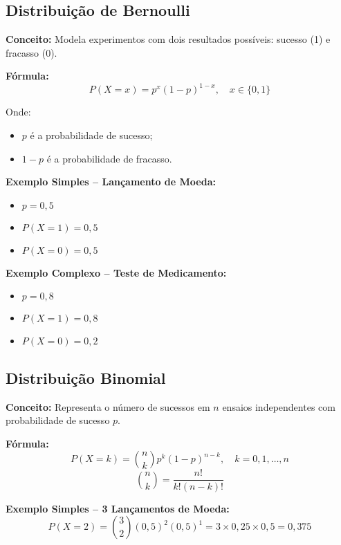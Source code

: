 \documentclass[a4paper,12pt]{article}
\begin{document}
\subsection{Distribuição de Bernoulli}

\textbf{Conceito:} Modela experimentos com dois resultados possíveis: sucesso (1) e fracasso (0).

\textbf{Fórmula:}
\begin{equation}
P(X = x) = p^x (1 - p)^{1 - x}, \quad x \in \{0, 1\}
\end{equation}

Onde:
\begin{itemize}
    \item \( p \) é a probabilidade de sucesso;
    \item \( 1 - p \) é a probabilidade de fracasso.
\end{itemize}

\textbf{Exemplo Simples – Lançamento de Moeda:}
\begin{itemize}
    \item \( p = 0{,}5 \)
    \item \( P(X = 1) = 0{,}5 \)
    \item \( P(X = 0) = 0{,}5 \)
\end{itemize}

\textbf{Exemplo Complexo – Teste de Medicamento:}
\begin{itemize}
    \item \( p = 0{,}8 \)
    \item \( P(X = 1) = 0{,}8 \)
    \item \( P(X = 0) = 0{,}2 \)
\end{itemize}

\subsection{Distribuição Binomial}

\textbf{Conceito:} Representa o número de sucessos em \( n \) ensaios independentes com probabilidade de sucesso \( p \).

\textbf{Fórmula:}
\begin{equation}
P(X = k) = \binom{n}{k} p^k (1 - p)^{n - k}, \quad k = 0, 1, \dots, n
\end{equation}
\begin{equation}
\binom{n}{k} = \frac{n!}{k!(n - k)!}
\end{equation}

\textbf{Exemplo Simples – 3 Lançamentos de Moeda:}
\[
P(X = 2) = \binom{3}{2} (0{,}5)^2 (0{,}5)^1 = 3 \times 0{,}25 \times 0{,}5 = 0{,}375
\]
\end{document}
